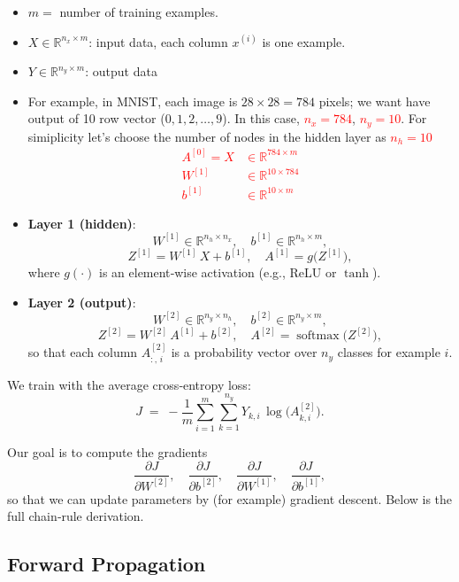 \documentclass{article}
\begin{document}
\begin{itemize}
  \item $m =$ number of training examples.
  \item $X \in \mathbb{R}^{n_x \times m}$: input data, each column $x^{(i)}$ is one example.
  \item $Y \in \mathbb{R}^{n_y \times m}$: output data
  \item For example, in MNIST, each image is $28\times28=784$ pixels; we want have output of 10 row vector ($0,1,2,\dots,9$). In this case, \textcolor{red}{$n_x=784$}, \textcolor{red}{$n_y=10$}. For simiplicity let's choose the number of nodes in the hidden layer as \textcolor{red}{$n_h=10$}
  \textcolor{red}{
  \begin{align}
      A^{[0]}=X &\in \mathbb{R}^{784 \times m}\\
      W^{[1]} &\in \mathbb{R}^{10 \times 784}\\
      b^{[1]} &\in \mathbb{R}^{10 \times m}
  \end{align}
  }
  \item \textbf{Layer 1 (hidden)}:
  \[
    W^{[1]} \in \mathbb{R}^{n_h \times n_x}, \quad
    b^{[1]} \in \mathbb{R}^{n_h \times m}, 
  \]
  \[
    Z^{[1]} = W^{[1]}\,X + b^{[1]}, 
    \quad
    A^{[1]} = g\bigl(Z^{[1]}\bigr),
  \]
  where $g(\cdot)$ is an element‐wise activation (e.g., ReLU or $\tanh$).
  \item \textbf{Layer 2 (output)}:
  \[
    W^{[2]} \in \mathbb{R}^{n_y \times n_h}, \quad
    b^{[2]} \in \mathbb{R}^{n_y \times m},
  \]
  \[
    Z^{[2]} = W^{[2]}\,A^{[1]} + b^{[2]}, 
    \quad
    A^{[2]} = \operatorname{softmax}\bigl(Z^{[2]}\bigr),
  \]
  so that each column $A^{[2]}_{:,\,i}$ is a probability vector over $n_y$ classes for example $i$.
\end{itemize}

We train with the average cross‐entropy loss:
\begin{equation}\label{eq:loss}
  J \;=\; -\frac{1}{m} \sum_{i=1}^m \sum_{k=1}^{n_y} 
    Y_{k,i}\,\log\!\bigl(A^{[2]}_{k,i}\bigr).
\end{equation}

Our goal is to compute the gradients
\[
  \frac{\partial J}{\partial W^{[2]}},\quad
  \frac{\partial J}{\partial b^{[2]}},\quad
  \frac{\partial J}{\partial W^{[1]}},\quad
  \frac{\partial J}{\partial b^{[1]}},
\]
so that we can update parameters by (for example) gradient descent. Below is the full chain‐rule derivation.

\bigskip
\pagebreak
\subsection{Forward Propagation}
\end{document}

